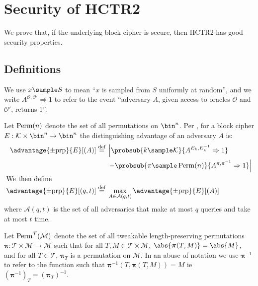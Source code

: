 \documentclass[hctr.tex]{subfiles}
\begin{document}
\section{Security of HCTR2}\label{security}
We prove that, if the underlying block cipher is secure, then
HCTR2 has good security properties.
\subsection{Definitions}
We use \(x \sample S\) to mean ``\(x\) is sampled from \(S\)
uniformly at random'', and we write
\(A^{\mathcal{O}, \mathcal{O}'}\Rightarrow 1\) to refer
to the event ``adversary \(A\),
given access to oracles \(\mathcal{O}\) and \(\mathcal{O}'\),
returns 1''.

Let $\operatorname{Perm}(n)$ denote the set of all permutations on \(\bin^n\).
Per \cite{concrete}, for a block cipher 
\(E: \mathcal{K} \times \bin^n \rightarrow \bin^n\)
the distinguishing advantage of an adversary \(A\) is:
%
\begin{align*}
    \advantage{\pm \mathrm{prp}}{E}[(A)] \defeq
    {}&\left\lvert\probsub{k \sample \mathcal{K}}{A^{E_k,E_k^{-1}}\Rightarrow 1}\right.
    \\
    {}&\left. - \probsub{\pi \sample \Perm(n)}{A^{\pi,\pi^{-1}}\Rightarrow 1}\right\rvert
    \\
    \intertext{We then define}
    \advantage{\pm \mathrm{prp}}{E}[(q, t)] \defeq
    {}&\max_{A \in \mathcal{A}(q, t)} \advantage{\pm \mathrm{prp}}{E}[(A)]
\end{align*}
where $\mathcal{A}(q, t)$
is the set of all adversaries that make at most $q$ queries and take at most $t$ time.

Let $\operatorname{Perm}^\mathcal{T}(\mathcal{M})$
denote the set of all
tweakable length-preserving permutations
$\bm{\pi} : \mathcal{T} \times \mathcal{M} \rightarrow \mathcal{M}$
such that for all $T, M \in \mathcal{T} \times \mathcal{M}$,
$\abs{\bm{\pi}(T, M)} = \abs{M}$, and
for all $T \in \mathcal{T}$, $\bm{\pi}_{T}$ is a permutation on \(\mathcal{M}\).
In an abuse of notation
we use $\bm{\pi}^{-1}$ to refer to the function
such that $\bm{\pi}^{-1}(T, \bm{\pi}(T, M)) = M$ ie $(\bm{\pi}^{-1})_T = (\bm{\pi}_T)^{-1}$.
\end{document}

